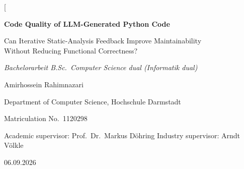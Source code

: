 \documentclass[10pt,a4paper,twocolumn]{article}
\newcommand{\submissiondate}{06.09.2026}
\begin{document}
\twocolumn[
  \begin{@twocolumnfalse}
  \begin{center}
    {\LARGE\bfseries Code Quality of LLM-Generated Python Code\par}
    \vspace{0.1em}
    {\fontsize{14.5}{17.4}\selectfont\color{black!55} Can Iterative Static-Analysis Feedback Improve Maintainability\\
    Without Reducing Functional Correctness?\par}
    \vspace{1.2em}
    {\normalsize\itshape Bachelorarbeit \quad\textbar\quad
     B.Sc.\ Computer Science dual (Informatik dual)\par}
    \vspace{1.0em}
    {\large Amirhossein Rahimnazari\par}
    \vspace{0.4em}
    {\normalsize Department of Computer Science, Hochschule Darmstadt\par}
    {\normalsize Matriculation No.\ 1120298\par}
    \vspace{0.3em}
    {\small Academic supervisor: Prof.\ Dr.\ Markus D\"ohring \quad\textbar\quad
     Industry supervisor: Arndt V\"olkle\par}
    \vspace{0.3em}
    {\small \submissiondate\par}
  \end{center}
  \vspace{1em}


\end{@twocolumnfalse}
\end{document}
